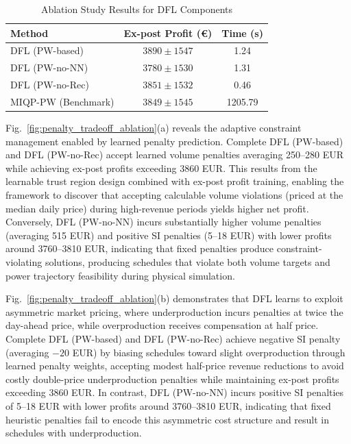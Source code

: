\documentclass[journal]{IEEEtran}
\begin{document}
\begin{table}[t!]
\centering
\caption{Ablation Study Results for DFL Components}
\label{tab:ablation_results}
\small
\begin{tabular}{lcc}
\toprule
\textbf{Method} & \textbf{Ex-post Profit (€)} & \textbf{Time (s)} \\
\midrule
DFL (PW-based) & $3890 \pm 1547$ & 1.24 \\
DFL (PW-no-NN) & $3780 \pm 1530$ & 1.31 \\
DFL (PW-no-Rec) & $3851 \pm 1532$ & 0.46 \\
\midrule
MIQP-PW (Benchmark) & $3849 \pm 1545$ & 1205.79 \\
\bottomrule
\end{tabular}
\end{table}

Fig.~\ref{fig:penalty_tradeoff_ablation}(a) reveals the adaptive constraint management enabled by learned penalty prediction. Complete DFL (PW-based) and DFL (PW-no-Rec) accept learned volume penalties averaging 250--280 EUR while achieving ex-post profits exceeding 3860 EUR. This results from the learnable trust region design combined with ex-post profit training, enabling the framework to discover that accepting calculable volume violations (priced at the median daily price) during high-revenue periods yields higher net profit. Conversely, DFL (PW-no-NN) incurs substantially higher volume penalties (averaging 515 EUR) and positive SI penalties (5--18 EUR) with lower profits around 3760--3810 EUR, indicating that fixed penalties produce constraint-violating solutions, producing schedules that violate both volume targets and power trajectory feasibility during physical simulation.

Fig.~\ref{fig:penalty_tradeoff_ablation}(b) demonstrates that DFL learns to exploit asymmetric market pricing, where underproduction incurs penalties at twice the day-ahead price, while overproduction receives compensation at half price. Complete DFL (PW-based) and DFL (PW-no-Rec) achieve negative SI penalty (averaging $-20$ EUR) by biasing schedules toward slight overproduction through learned penalty weights, accepting modest half-price revenue reductions to avoid costly double-price underproduction penalties while maintaining ex-post profits exceeding 3860 EUR. In contrast, DFL (PW-no-NN) incurs positive SI penalties of 5--18 EUR with lower profits around 3760--3810 EUR, indicating that fixed heuristic penalties fail to encode this asymmetric cost structure and result in schedules with underproduction. 
\end{document}
